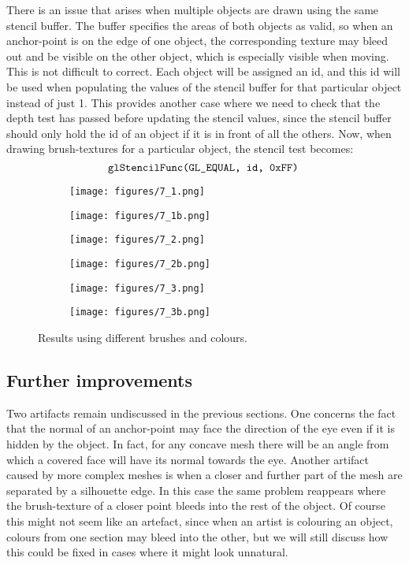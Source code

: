 \documentclass[a4paper, 12pt]{article}
\begin{document}
There is an issue that arises when multiple objects are drawn using the same stencil buffer. The buffer specifies the areas of both objects as valid, so when an anchor-point is on the edge of one object, the corresponding texture may bleed out and be visible on the other object, which is especially visible when moving. This is not difficult to correct. Each object will be assigned an id, and this id will be used when populating the values of the stencil buffer for that particular object instead of just 1. This provides another case where we need to check that the depth test has passed before updating the stencil values, since the stencil buffer should only hold the id of an object if it is in front of all the others. Now, when drawing brush-textures for a particular object, the stencil test becomes:
$$\texttt{glStencilFunc(GL\_EQUAL, id, 0xFF)\;}$$

\begin{figure}
  \centering
  \begin{subfigure}{0.5\columnwidth}
    \texttt{[image: figures/7\_1.png]}
  \end{subfigure}
  \begin{subfigure}{0.2\columnwidth}
    \texttt{[image: figures/7\_1b.png]}
  \end{subfigure}
  \begin{subfigure}{0.5\columnwidth}
    \texttt{[image: figures/7\_2.png]}
  \end{subfigure}
  \begin{subfigure}{0.2\columnwidth}
    \texttt{[image: figures/7\_2b.png]}
  \end{subfigure}
  \begin{subfigure}{0.5\columnwidth}
    \texttt{[image: figures/7\_3.png]}
  \end{subfigure}
  \begin{subfigure}{0.2\columnwidth}
    \texttt{[image: figures/7\_3b.png]}
  \end{subfigure}
  \caption{Results using different brushes and colours.}
\end{figure}


\subsection{Further improvements}
Two artifacts remain undiscussed in the previous sections. One concerns the fact that the normal of an anchor-point may face the direction of the eye even if it is hidden by the object. In fact, for any concave mesh there will be an angle from which a covered face will have its normal towards the eye. Another artifact caused by more complex meshes is when a closer and further part of the mesh are separated by a silhouette edge. In this case the same problem reappears where the brush-texture of a closer point bleeds into the rest of the object. Of course this might not seem like an artefact, since when an artist is colouring an object, colours from one section may bleed into the other, but we will still discuss how this could be fixed in cases where it might look unnatural.
\end{document}
